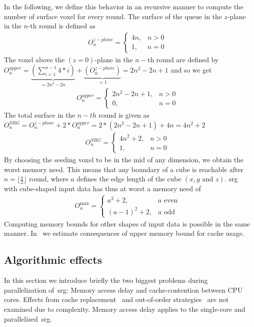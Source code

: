 \documentclass{article}
\newcommand{\floor}[1]{\lfloor #1 \rfloor}
\begin{document}
In the following, we define this behavior in an recursive manner to compute the number of surface voxel for every round.
The surface of the queue in the $z$-plane in the $n$-th round is defined as
\begin{align}
  O_n^{z-plane} = \begin{cases}
    4n, &n>0\\
    1,  &n=0
  \end{cases}\label{eq:zplane}
\end{align}
The voxel above the $(z=0)$-plane in the $n-$th round are defined by $O_n^{upper} = \underbrace{(\sum_{i=1}^{n-1} 4*i)}_{=2n^2-2n} + \underbrace{(O_0^{z-plane})}_{= 1} = 2n^2 -2n +1$ and so we get
\begin{align}
  O_n^{upper} =
    \begin{cases} 2n^2 -2n +1, &n>0 \\
                            0, &n=0
    \end{cases}\label{eq:upper}
\end{align}
The total surface in the $n-th$ round is given as $O_n^{SRG} = O_n^{z-plane} + 2*O_n^{upper} = 2*(2n^2 -2n +1) + 4n = 4n^2 + 2$
\begin{align}
  O_n^{SRG} = \begin{cases}
    4n^2 + 2, &n>0 \\
           1, &n=0
  \end{cases}\label{eq:total}
\end{align}
By choosing the seeding voxel to be in the mid of any dimension, we obtain the worst memory need.
This means that any boundary of a cube is reachable after $n=\floor{\frac{a}{2}}$ round, where $a$ defines the edge length of the cube $(x,y \text{ and } z)$.
\Ac{srg} with cube-shaped input data has thus at worst a memory need of
\begin{align}
  O^\text{max}_n = \begin{cases}
    a^2+2, &a \text{ even}\\
    (a-1)^2+2, &a \text{ odd}
  \end{cases}\label{eq:octahedron}
\end{align}
Computing memory bounds for other shapes of input data is possible in the same manner.
In~ we estimate consequences of upper memory bound for cache usage.

\subsection{Algorithmic effects}\label{subsec:algeffects}
In this section we introduce briefly the two biggest problems during parallelization of~\ac{srg}: Memory access delay and cache-contention between CPU cores.
Effects from cache replacement~\cite{vila2020} and out-of-order strategies~\cite{alipour2017} are not examined due to complexity.
Memory access delay applies to the single-core and parallelized~\ac{srg}.
\end{document}
